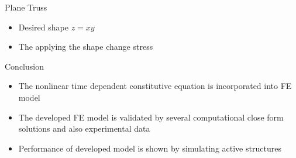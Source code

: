 \documentclass{beamer}
\begin{document}
\begin{frame}{Plane Truss}
\begin{itemize}
\item Desired shape $z=xy$
\begin{figure}  
\end{figure}

\item The applying the shape change stress
\begin{figure}
\end{figure}
\end{itemize}
\end{frame}

\begin{frame}{Conclusion}
\begin{itemize}
\item The nonlinear time dependent constitutive equation is  incorporated into FE model
\item The developed FE model is validated by several computational close form solutions and also experimental data
\item Performance of developed model is shown by simulating  active structures
\end{itemize}   
\end{frame}
\end{document}
